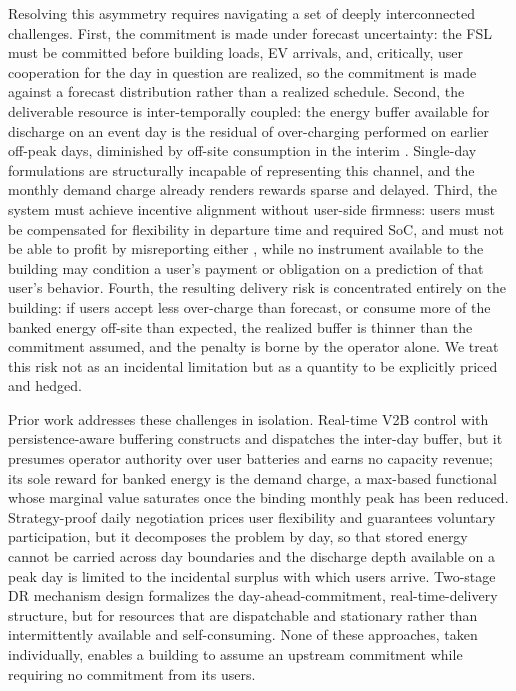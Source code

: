 Resolving this asymmetry requires navigating a set of deeply interconnected
challenges. First, the commitment is made under forecast uncertainty: the
FSL must be committed before building loads, EV arrivals, and, critically,
user cooperation for the day in question are realized, so the commitment
is made against a forecast distribution rather than a
realized schedule. Second, the deliverable resource is inter-temporally
coupled: the energy buffer available for discharge on an event day is the
residual of over-charging performed on earlier off-peak days, diminished by
off-site consumption in the interim \cite{sen2026negotiations}. Single-day formulations
are structurally incapable of representing this channel, and the monthly
demand charge already renders rewards sparse and delayed. Third, the system
must achieve incentive alignment without user-side firmness: users must be
compensated for flexibility in departure time and required SoC, and must
not be able to profit by misreporting either \cite{sen2026consent}, while no
instrument available to the building may condition a user's payment or
obligation on a prediction of that user's behavior. Fourth, the resulting
delivery risk is concentrated entirely on the building: if users accept
less over-charge than forecast, or consume more of the banked energy
off-site than expected, the realized buffer is thinner than the commitment
assumed, and the penalty is borne by the operator alone. We treat this risk
not as an incidental limitation but as a quantity to be explicitly priced
and hedged.
 
Prior work addresses these challenges in isolation. Real-time V2B control
with persistence-aware buffering \cite{sen2026negotiations} constructs and dispatches the
inter-day buffer, but it presumes operator authority over user batteries
and earns no capacity revenue; its sole reward for banked energy is the
demand charge, a max-based functional whose marginal value saturates once
the binding monthly peak has been reduced. Strategy-proof daily negotiation
\cite{sen2026consent} prices user flexibility and guarantees voluntary participation,
but it decomposes the problem by day, so that stored energy cannot be
carried across day boundaries and the discharge depth available on a peak
day is limited to the incidental surplus with which users arrive. Two-stage
DR mechanism design \cite{satchidanandan2022two} formalizes the
day-ahead-commitment, real-time-delivery structure, but for resources that
are dispatchable and stationary rather than intermittently available and
self-consuming. None of these approaches, taken individually, enables a
building to assume an upstream commitment while requiring no commitment
from its users.
 
